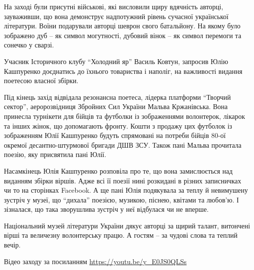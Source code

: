 На заході були присутні військові, які висловили щиру вдячність авторці,
зауваживши, що вона демонструє надпотужний рівень сучасної української
літератури. Воїни подарували авторці шеврон свого батальйону. На якому було
зображено дуб – як символ могутності, дубовий вінок – як символ перемоги та
сонечко у сварзі. 

Учасник Історичного клубу \enquote{Холодний яр} Василь Ковтун, запросив Юлію Кашпуренко
доєднатись до їхнього товариства і наполіг, на важливості видання поетесою
власної збірки.

Під кінець захід відвідала резонансна поетеса, лідерка платформи \enquote{Творчий
сектор}, аеророзвідниця Збройних Сил України Мальва Кржанівська. Вона принесла
турнікети для бійців та футболки із зображеннями волонтерок, лікарок та інших
жінок, що допомагають фронту. Кошти з продажу цих футболок із зображенням Юлії
Кашпуренко будуть спрямовані на потреби бійців 80-ої окремої десантно-штурмової
бригади ДШВ ЗСУ. Також пані Мальва прочитала поезію, яку присвятила пані Юлії. 

Насамкінець Юлія Кашпуренко розповіла про те, що вона замислюється над виданням
збірки віршів. Адже всі її поезії нині розкидані в різних записничках чи то на
сторінках Facebook. А ще пані Юлія подякувала за теплу й невимушену зустріч у
музеї, що \enquote{дихала} поезією, музикою, піснею, квітами та любов'ю. І зізналася,
що така зворушлива зустріч у неї відбулася чи не вперше. 

Національний музей літератури України дякує авторці за щирий талант, витончені
вірші та величезну волонтерську працю. А гостям – за чудові слова та теплий
вечір.

Відео заходу за посиланням \url{https://youtu.be/y_E0JS0QLSs}
